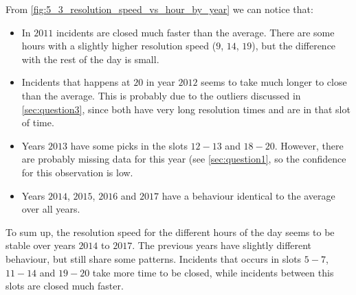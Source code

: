 From \cref{fig:5_3_resolution_speed_vs_hour_by_year} we can notice that:
\begin{itemize}
    \item In $2011$ incidents are closed much faster than the average. There are some hours with a slightly higher resolution speed ($9$, $14$, $19$), but the difference with the rest of the day is small.
    \item Incidents that happens at $20$ in year $2012$ seems to take much longer to close than the average. This is probably due to the outliers discussed in \cref{sec:question3}, since both have very long resolution times and are in that slot of time.
    \item Years $2013$ have some picks in the slots $12 - 13$ and $18 - 20$. However, there are probably missing data for this year (see \cref{sec:question1}, so the confidence for this observation is low.
    \item Years $2014$, $2015$, $2016$ and $2017$ have a behaviour identical to the average over all years.    
\end{itemize}

To sum up, the resolution speed for the different hours of the day seems to be stable over years $2014$ to $2017$.
The previous years have slightly different behaviour, but still share some patterns.
Incidents that occurs in slots $5 - 7$, $11 - 14$ and $19 - 20$ take more time to be closed, while incidents between this slots are closed much faster.
